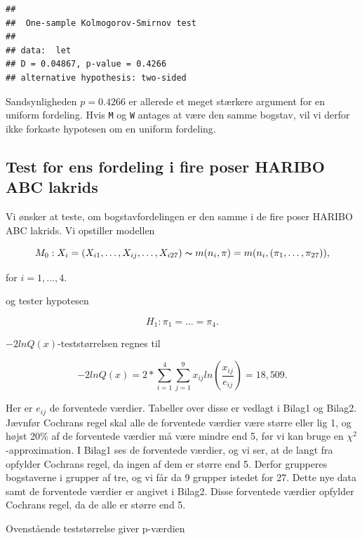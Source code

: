 \documentclass[]{article}
\begin{document}
\begin{verbatim}
## 
##  One-sample Kolmogorov-Smirnov test
## 
## data:  let
## D = 0.04867, p-value = 0.4266
## alternative hypothesis: two-sided
\end{verbatim}

Sandsynligheden \(p = 0.4266\) er allerede et meget stærkere argument
for en uniform fordeling. Hvis \texttt{M} og \texttt{W} antages at være
den samme bogstav, vil vi derfor ikke forkaste hypotesen om en uniform
fordeling.

\subsection{Test for ens fordeling i fire poser HARIBO ABC
lakrids}\label{test-for-ens-fordeling-i-fire-poser-haribo-abc-lakrids}

Vi ønsker at teste, om bogstavfordelingen er den samme i de fire poser
HARIBO ABC lakrids. Vi opstiller modellen

\begin{equation*}
M_0:X_i=(X_{i1},\ldots,X_{ij},\ldots,X_{i27}) \thicksim m(n_i,\pi)=m(n_i,(\pi_1,\ldots,\pi_{27})),
\end{equation*}

for \(i=1,\ldots,4\).

og tester hypotesen

\begin{equation*}
H_1:\pi_1=\dots=\pi_4.
\end{equation*}

\(-2lnQ(x)\)-teststørrelsen regnes til

\begin{equation*}
-2lnQ(x)=2*\sum^4_{i=1}\sum^{9}_{j=1}x_{ij}ln(\frac{x_{ij}}{e_{ij}})=18,509.
\end{equation*}

Her er \(e_{ij}\) de forventede værdier. Tabeller over disse er vedlagt
i Bilag1 og Bilag2. Jævnfør Cochrans regel skal alle de forventede
værdier være større eller lig 1, og højst 20\% af de forventede værdier
må være mindre end 5, før vi kan bruge en \(\chi^2\)-approximation. I
Bilag1 ses de forventede værdier, og vi ser, at de langt fra opfylder
Cochrans regel, da ingen af dem er større end 5. Derfor grupperes
bogstaverne i grupper af tre, og vi får da 9 grupper istedet for 27.
Dette nye data samt de forventede værdier er angivet i Bilag2. Disse
forventede værdier opfylder Cochrans regel, da de alle er større end 5.

Ovenstående teststørrelse giver p-værdien
\end{document}
